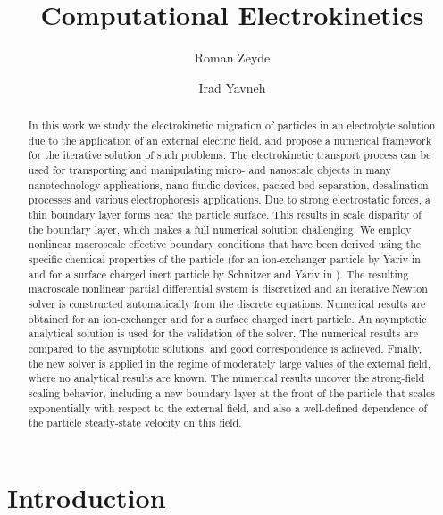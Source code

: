 \documentclass[preprint,10pt]{elsarticle}
\begin{document}
\begin{frontmatter}

\author{Roman Zeyde}

\author{Irad Yavneh}

\address{Technion -- Israel Institute of Technology, Haifa 32000, Israel}

\title{Computational Electrokinetics}

\begin{abstract}
In this work we study the electrokinetic 
migration of particles in an electrolyte solution 
due to the application of an external electric field,
and propose a numerical framework for the iterative solution of such problems.
The electrokinetic transport process can be used for
transporting and manipulating micro- and nanoscale objects in 
many nanotechnology applications, nano-fluidic devices, packed-bed separation, 
desalination processes and various electrophoresis applications.
Due to strong electrostatic forces, a thin boundary layer forms near the particle
surface. This results in scale disparity of the boundary layer, which makes a 
full numerical solution challenging. 
We employ nonlinear macroscale effective boundary conditions that have been derived
using the specific chemical properties of the particle
(for an ion-exchanger particle by Yariv in \cite{yariv2010migration}
and for a surface charged inert particle by Schnitzer and Yariv in \cite{schnitzer2012surface}).
The resulting macroscale nonlinear partial differential system 
is discretized and an iterative Newton solver is
constructed automatically from the discrete equations.
Numerical results are obtained for an ion-exchanger and 
for a surface charged inert particle. 
An asymptotic analytical solution is 
used for the validation of the solver. 
The numerical results are compared to the asymptotic solutions, 
and good correspondence is achieved.
Finally, the new solver is applied in the regime of moderately large values of the external field, where no analytical results are known. The numerical results uncover the strong-field scaling behavior, including a new boundary layer at the front of the particle that scales exponentially with respect to the external field, and also a well-defined dependence of the particle steady-state velocity on this field.
\end{abstract}

\end{frontmatter}

\section{Introduction}
\end{document}
